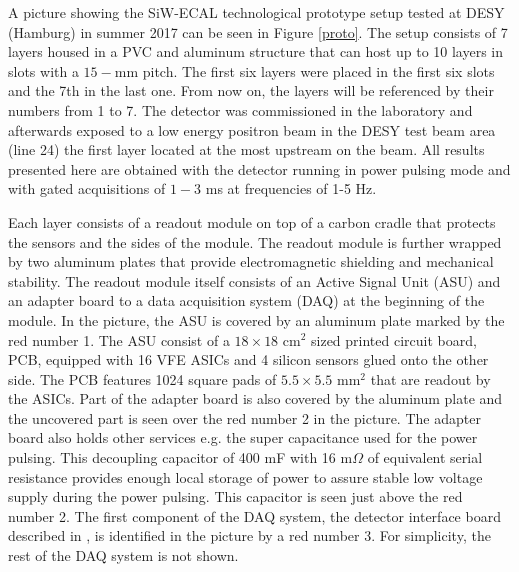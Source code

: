 \documentclass[final,3p,times,twocolumn]{elsarticle}
\begin{document}
A picture showing the SiW-ECAL technological prototype setup tested at DESY (Hamburg) in summer
2017 can be seen in Figure \ref{proto}.
The setup consists of 7 layers housed in a PVC and aluminum structure that can host up to 10 layers
in slots with a $15-$mm pitch. The first six layers were placed in the first six slots
and the 7th in the last one.
From now on, the layers will be referenced by their numbers from 1 to 7.
The detector was commissioned in the laboratory
and afterwards exposed to a low energy positron beam in the DESY test beam area (line 24) \cite{Diener:2018qap} the first layer located at the most upstream on the beam.
All results presented here are obtained with the detector running in power pulsing mode
and with gated acquisitions of $1-3$ ms at frequencies of 1-5 Hz.

Each layer consists of a readout module
on top of a carbon cradle that protects the sensors
and the sides of the module. The readout module is further wrapped by two aluminum plates
that provide electromagnetic shielding and mechanical stability.
The readout module itself consists of an Active Signal Unit (ASU) and an adapter board
to a data acquisition system (DAQ)\cite{Gastaldi:2014vaa,Rubio-Roy:2017ere,Magniette:2018wdz} at the beginning of the module.
In the picture, the ASU is covered 
by an aluminum plate marked by the red number 1.
The ASU consist of a $18\times18$ cm$^2$ sized printed circuit board, PCB,
equipped with 16 VFE ASICs and 4 silicon sensors glued onto the other side.
The PCB features 1024 square pads of $5.5\times5.5$ mm$^2$ that are readout by the ASICs.
Part of the adapter board is also covered by the aluminum plate and the uncovered part 
is seen over the red number 2 in the picture. 
The adapter board also holds other
services e.g. the super capacitance used for the power pulsing. 
This decoupling capacitor of 400 mF with 16 m$\Omega$ of equivalent serial resistance
provides enough local storage 
of power to assure stable low voltage supply during the power pulsing. This capacitor
is seen just above the red number 2.
The first component
of the DAQ system, the detector interface board described in \cite{Gastaldi:2014vaa}, is identified in the picture by a red
number 3.
For simplicity, the rest of the DAQ system is not shown.
\end{document}
